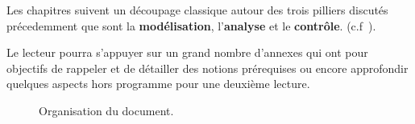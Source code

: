 Les chapitres suivent un découpage classique                                                            
autour des trois pilliers discutés précedemment que sont la 
\textbf{modélisation}, l'\textbf{analyse} et le \textbf{contrôle}.
(c.f~).

Le lecteur pourra s'appuyer sur un grand nombre d'annexes 
qui ont pour objectifs de rappeler et de détailler 
des notions prérequises ou encore approfondir quelques aspects 
hors programme pour une deuxième lecture.  

\begin{figure}[!h]
\renewcommand\thefigure{A}
\begin{center}
{
\tikzset{external/export=false}

}
\end{center}
\caption{Organisation du document.\label{fig-diagramme_cours}}
\end{figure}
